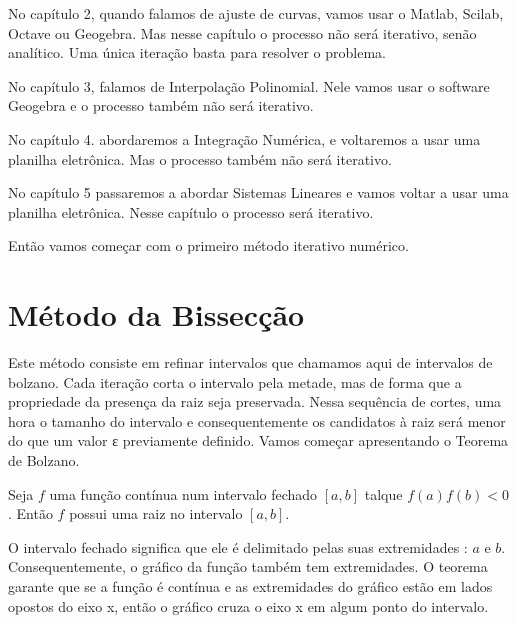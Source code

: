 \documentclass[
  letterpaper,
  DIV=11,
  numbers=noendperiod]{scrreprt}
\begin{document}
No capítulo 2, quando falamos de ajuste de curvas, vamos usar o Matlab,
Scilab, Octave ou Geogebra. Mas nesse capítulo o processo não será
iterativo, senão analítico. Uma única iteração basta para resolver o
problema.

No capítulo 3, falamos de Interpolação Polinomial. Nele vamos usar o
software Geogebra e o processo também não será iterativo.

No capítulo 4. abordaremos a Integração Numérica, e voltaremos a usar
uma planilha eletrônica. Mas o processo também não será iterativo.

No capítulo 5 passaremos a abordar Sistemas Lineares e vamos voltar a
usar uma planilha eletrônica. Nesse capítulo o processo será iterativo.

Então vamos começar com o primeiro método iterativo numérico.

\section{Método da Bissecção}\label{muxe9todo-da-bissecuxe7uxe3o}

Este método consiste em refinar intervalos que chamamos aqui de
intervalos de bolzano. Cada iteração corta o intervalo pela metade, mas
de forma que a propriedade da presença da raiz seja preservada. Nessa
sequência de cortes, uma hora o tamanho do intervalo e consequentemente
os candidatos à raiz será menor do que um valor ɛ previamente definido.
Vamos começar apresentando o Teorema de Bolzano.

\begin{tcolorbox}[enhanced jigsaw, toptitle=1mm, opacitybacktitle=0.6, arc=.35mm, breakable, left=2mm, leftrule=.75mm, title=\textcolor{quarto-callout-note-color}{\faInfo}\hspace{0.5em}{Teorema de Bolzano}, coltitle=black, colback=white, rightrule=.15mm, colframe=quarto-callout-note-color-frame, titlerule=0mm, bottomtitle=1mm, bottomrule=.15mm, toprule=.15mm, colbacktitle=quarto-callout-note-color!10!white, opacityback=0]

Seja \(f\) uma função contínua num intervalo fechado \([a,b]\) talque
\(f(a)f(b)<0\). Então \(f\) possui uma raiz no intervalo \([a,b]\).

\end{tcolorbox}

O intervalo fechado significa que ele é delimitado pelas suas
extremidades : \(a\) e \(b\). Consequentemente, o gráfico da função
também tem extremidades. O teorema garante que se a função é contínua e
as extremidades do gráfico estão em lados opostos do eixo x, então o
gráfico cruza o eixo x em algum ponto do intervalo.
\end{document}
